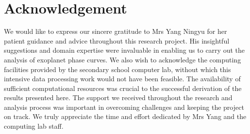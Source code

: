 \documentclass{article}
\begin{document}
\newpage
{}
\section*{Acknowledgement}
We would like to express our sincere gratitude to Mrs Yang Ningyu for her patient guidance and advice throughout this research project. His insightful suggestions and domain expertise were invaluable in enabling us to carry out the analysis of exoplanet phase curves.
We also wish to acknowledge the computing facilities provided by the secondary school computer lab, without which this intensive data processing work would not have been feasible. The availability of sufficient computational resources was crucial to the successful derivation of the results presented here.
The support we received throughout the research and analysis process was important in overcoming challenges and keeping the project on track. We truly appreciate the time and effort dedicated by Mrs Yang and the computing lab staff.
\end{document}
